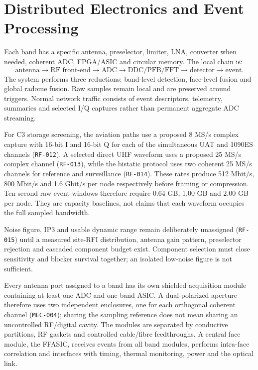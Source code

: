 \chapter{Distributed Electronics and Event Processing}

Each band has a specific antenna, preselector, limiter, LNA, converter when needed, coherent ADC, FPGA/ASIC and circular memory. The local chain is:
\[
\text{antenna}\rightarrow\text{RF front-end}\rightarrow\text{ADC}\rightarrow\text{DDC/PFB/FFT}\rightarrow\text{detector}\rightarrow\text{event}.
\]
The system performs three reductions: band-level detection, face-level fusion and global radome fusion. Raw samples remain local and are preserved around triggers. Normal network traffic consists of event descriptors, telemetry, summaries and selected I/Q captures rather than permanent aggregate ADC streaming.

For C3 storage screening, the aviation paths use a proposed 8 MS/s complex capture with 16-bit I and 16-bit Q for each of the simultaneous UAT and 1090ES channels (\texttt{RF-012}). A selected direct UHF waveform uses a proposed 25 MS/s complex channel (\texttt{RF-013}), while the bistatic protocol uses two coherent 25 MS/s channels for reference and surveillance (\texttt{RF-014}). These rates produce 512 Mbit/s, 800 Mbit/s and 1.6 Gbit/s per node respectively before framing or compression. Ten-second raw event windows therefore require 0.64 GB, 1.00 GB and 2.00 GB per node. They are capacity baselines, not claims that each waveform occupies the full sampled bandwidth.

Noise figure, IP3 and usable dynamic range remain deliberately unassigned (\texttt{RF-015}) until a measured site-RFI distribution, antenna gain pattern, preselector rejection and cascaded component budget exist. Component selection must close sensitivity and blocker survival together; an isolated low-noise figure is not sufficient.

Every antenna port assigned to a band has its own shielded acquisition module containing at least one ADC and one band ASIC. A dual-polarized aperture therefore uses two independent enclosures, one for each orthogonal coherent channel (\texttt{MEC-004}); sharing the sampling reference does not mean sharing an uncontrolled RF/digital cavity. The modules are separated by conductive partitions, RF gaskets and controlled cable/fibre feedthroughs. A central face module, the FFASIC, receives events from all band modules, performs intra-face correlation and interfaces with timing, thermal monitoring, power and the optical link.

